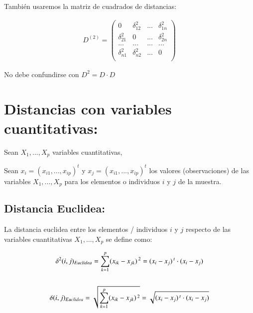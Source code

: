 \documentclass[12pt]{report} %
\begin{document}
También usaremos la matriz de cuadrados de distancias:

\begin{tcolorbox}[toptitle=2mm,title= Matriz de distancias al cuadrado:   ]
\begin{gather*}
D^{(2)}= \begin{pmatrix}
0 & \delta^2_{12}&...&\delta^2_{1n}\\
\delta^2_{21} & 0&...&\delta^2_{2n}\\
...&...&...&...\\
\delta^2_{n1}& \delta^2_{n2}&...& 0\\
\end{pmatrix}
\end{gather*}

\end{tcolorbox}


No debe confundirse con  $D^2=D\cdot D$



\chapter{Distancias con variables cuantitativas:}

Sean $X_1,...,X_p$ variables cuantitativas, 

Sean $x_i=(x_{i1},...,x_{ip})^t$ \hspace{0.2cm}y\hspace{0.2cm}
$x_j=(x_{i1},...,x_{ip})^t$ los valores (observaciones) de las variables $X_1,...,X_p$ para los elementos o individuos $i$ y $j$ de la muestra.


\section{Distancia Euclidea:}

\begin{tcolorbox}[toptitle=2mm,title= Distancia Euclidea:   ]
La distancia euclidea entre los elementos / individuos $i$ y $j$ respecto de las variables cuantitativas $X_1,...,X_p$ se define como:

\begin{gather*}
\delta^2(i,j)_{Euclidea} = \sum_{k=1}^{p} (x_{ik} - x_{jk})\hspace{0.05cm}^2 = (x_i - x_j)\hspace{0.05cm}^t\cdot (x_i - x_j) \\ \\
\delta(i,j)_{Euclidea} =\sqrt{\sum_{k=1}^{p} (x_{ik} - x_{jk})\hspace{0.05cm}^2  }  = \sqrt{(x_i - x_j)\hspace{0.05cm}^t\cdot (x_i - x_j)}
\end{gather*}

\end{tcolorbox}
\end{document}
